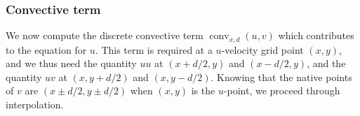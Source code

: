 \documentclass[preprint]{elsarticle}
\begin{document}
% 
% 
% 

\subsubsection{Convective term}

We now compute the discrete convective term
$\operatorname{conv}_{x, d}(u, v)$ which contributes to the equation for $u$.
This term is required at a $u$-velocity grid point $(x, y)$, and we thus need
the quantity $u u$ at $(x + d / 2, y)$ and $(x - d / 2, y)$, and the quantity
$u v$ at $(x, y + d / 2)$ and $(x, y - d / 2)$. Knowing that the native points
of $v$ are $(x \pm d / 2, y \pm d / 2)$ when $(x, y)$ is the $u$-point,
we proceed through interpolation.
\end{document}
